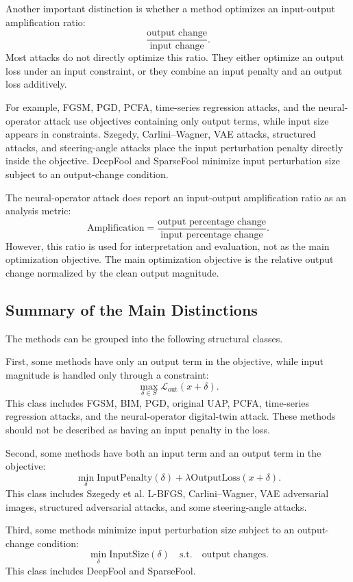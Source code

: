 \documentclass{article}
\begin{document}
Another important distinction is whether a method optimizes an input-output amplification ratio:
\[
    \frac{\text{output change}}{\text{input change}}.
\]
Most attacks do not directly optimize this ratio. They either optimize an output loss under an input constraint, or they combine an input penalty and an output loss additively.

For example, FGSM, PGD, PCFA, time-series regression attacks, and the neural-operator attack use objectives containing only output terms, while input size appears in constraints. Szegedy, Carlini--Wagner, VAE attacks, structured attacks, and steering-angle attacks place the input perturbation penalty directly inside the objective. DeepFool and SparseFool minimize input perturbation size subject to an output-change condition.

The neural-operator attack does report an input-output amplification ratio as an analysis metric:
\[
    \mathrm{Amplification}
    =
    \frac{
        \text{output percentage change}
    }{
        \text{input percentage change}
    }.
\]
However, this ratio is used for interpretation and evaluation, not as the main optimization objective. The main optimization objective is the relative output change normalized by the clean output magnitude.

\subsection{Summary of the Main Distinctions}

The methods can be grouped into the following structural classes.

First, some methods have only an output term in the objective, while input magnitude is handled only through a constraint:
\[
    \max_{\delta\in S}
    \mathcal{L}_{\mathrm{out}}(x+\delta).
\]
This class includes FGSM, BIM, PGD, original UAP, PCFA, time-series regression attacks, and the neural-operator digital-twin attack. These methods should not be described as having an input penalty in the loss.

Second, some methods have both an input term and an output term in the objective:
\[
    \min_\delta
    \mathrm{InputPenalty}(\delta)
    +
    \lambda \mathrm{OutputLoss}(x+\delta).
\]
This class includes Szegedy et al. L-BFGS, Carlini--Wagner, VAE adversarial images, structured adversarial attacks, and some steering-angle attacks.

Third, some methods minimize input perturbation size subject to an output-change condition:
\[
    \min_\delta \mathrm{InputSize}(\delta)
    \quad
    \text{s.t.}
    \quad
    \text{output changes}.
\]
This class includes DeepFool and SparseFool.
\end{document}
